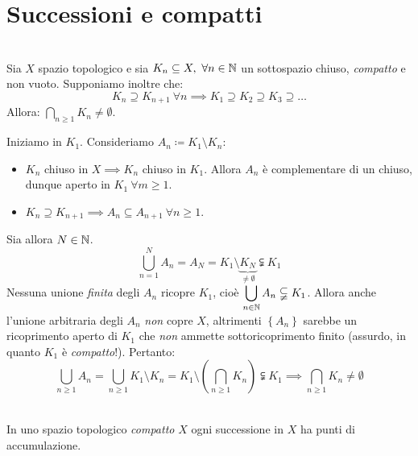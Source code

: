 \section{Successioni e compatti}
\begin{proposition}~{}\label{compattocontenuto}\\
Sia $X$ spazio topologico e sia $K_n\subseteq X,\ \forall n\in\naturalset$ un sottospazio chiuso, \textit{compatto} e non vuoto. Supponiamo inoltre che:
\begin{equation*}
K_n\supseteq K_{n+1}\ \forall n\implies K_1\supseteq K_2\supseteq K_3\supseteq \ldots
\end{equation*}
Allora: $\displaystyle\bigcap_{n\geq 1}K_n\neq\emptyset$.
\end{proposition}
\begin{demonstration}
Iniziamo in $K_1$. Consideriamo $A_n\coloneqq K_1\setminus K_n$:
\begin{itemize}
	\item $K_n$ chiuso in $X\implies K_n$ chiuso in $K_1$. Allora $A_n$ è complementare di un chiuso, dunque aperto in $K_1\ \forall m\geq 1$.
	\item $K_n\supseteq K_{n+1}\implies A_n\subseteq A_{n+1}\ \forall n\geq 1$.
\end{itemize}
Sia allora $N\in\mathbb{N}$.
\begin{equation*}
	\bigcup_{n=1}^{N}A_n=A_N=K_1\setminus \underbrace{K_N}_{\neq\emptyset}\subsetneqq K_1
\end{equation*}
Nessuna unione \textit{finita} degli $A_n$ ricopre $K_1$, cioè $\displaystyle \bigcup_{n\in\mathbb{N}}A_n\subsetneqq K_1$. Allora anche l'unione arbitraria degli $A_n$ \textit{non} copre $X$, altrimenti $\left\{A_n\right\}$ sarebbe un ricoprimento aperto di $K_1$ che \textit{non} ammette sottoricoprimento finito (assurdo, in quanto $K_1$ è \textit{compatto}!). Pertanto:
\begin{equation*}
\bigcup_{n\geq 1}A_n=\bigcup_{n\geq 1}K_1\setminus K_n=K_1\setminus \left(\bigcap_{n\geq 1}K_n\right)\subsetneqq K_1\implies \bigcap_{n\geq 1}K_n\neq\emptyset
\end{equation*}
\vspace{-6mm}
\end{demonstration}
\begin{lemming}~{}\\
In uno spazio topologico \textit{compatto} $X$ ogni successione in $X$ ha punti di accumulazione.
\end{lemming}
